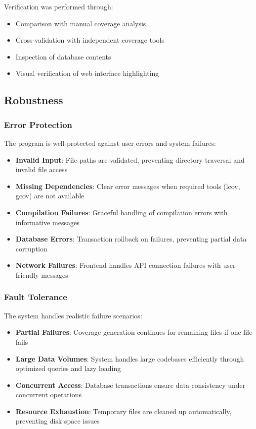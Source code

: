 Verification was performed through:
\begin{itemize}
    \item Comparison with manual coverage analysis
    \item Cross-validation with independent coverage tools
    \item Inspection of database contents
    \item Visual verification of web interface highlighting
\end{itemize}

\subsection{Robustness}

\subsubsection{Error Protection}

The program is well-protected against user errors and system failures:

\begin{itemize}
    \item \textbf{Invalid Input}: File paths are validated, preventing directory traversal and invalid file access
    \item \textbf{Missing Dependencies}: Clear error messages when required tools (lcov, gcov) are not available
    \item \textbf{Compilation Failures}: Graceful handling of compilation errors with informative messages
    \item \textbf{Database Errors}: Transaction rollback on failures, preventing partial data corruption
    \item \textbf{Network Failures}: Frontend handles API connection failures with user-friendly messages
\end{itemize}

\subsubsection{Fault Tolerance}

The system handles realistic failure scenarios:

\begin{itemize}
    \item \textbf{Partial Failures}: Coverage generation continues for remaining files if one file fails
    \item \textbf{Large Data Volumes}: System handles large codebases efficiently through optimized queries and lazy loading
    \item \textbf{Concurrent Access}: Database transactions ensure data consistency under concurrent operations
    \item \textbf{Resource Exhaustion}: Temporary files are cleaned up automatically, preventing disk space issues
\end{itemize}

